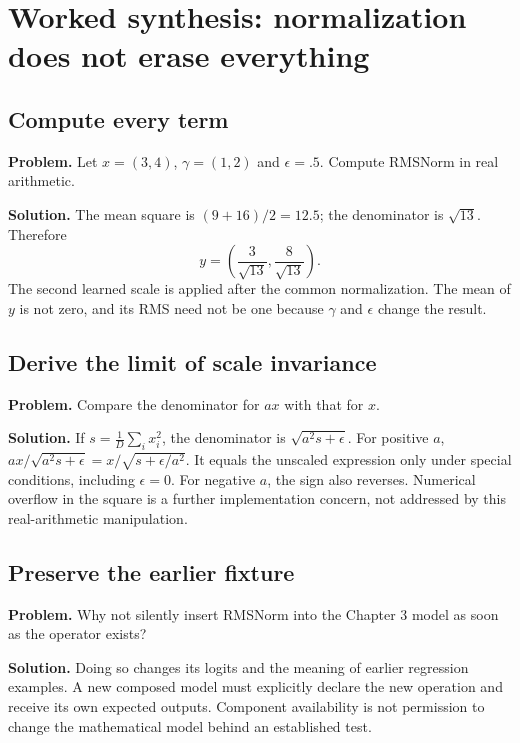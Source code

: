 \section{Worked synthesis: normalization does not erase everything}
\subsection{Compute every term}
\textbf{Problem.} Let $x=(3,4)$, $\gamma=(1,2)$ and $\epsilon=.5$.
Compute RMSNorm in real arithmetic.

\textbf{Solution.} The mean square is $(9+16)/2=12.5$; the denominator is
$\sqrt{13}$. Therefore
\begin{equation}
y=\left(\frac3{\sqrt{13}},\frac8{\sqrt{13}}\right).
\end{equation}
The second learned scale is applied after the common normalization. The
mean of $y$ is not zero, and its RMS need not be one because $\gamma$ and
$\epsilon$ change the result.

\subsection{Derive the limit of scale invariance}
\textbf{Problem.} Compare the denominator for $ax$ with that for $x$.

\textbf{Solution.} If $s=\frac1D\sum_i x_i^2$, the denominator is
$\sqrt{a^2s+\epsilon}$. For positive $a$,
$ax/\sqrt{a^2s+\epsilon}=x/\sqrt{s+\epsilon/a^2}$.
It equals the unscaled expression only under special conditions, including
$\epsilon=0$. For negative $a$, the sign also reverses. Numerical overflow in
the square is a further implementation concern, not addressed by this
real-arithmetic manipulation.

\subsection{Preserve the earlier fixture}
\textbf{Problem.} Why not silently insert RMSNorm into the Chapter 3 model
as soon as the operator exists?

\textbf{Solution.} Doing so changes its logits and the meaning of earlier
regression examples. A new composed model must explicitly declare the new
operation and receive its own expected outputs. Component availability is
not permission to change the mathematical model behind an established test.

